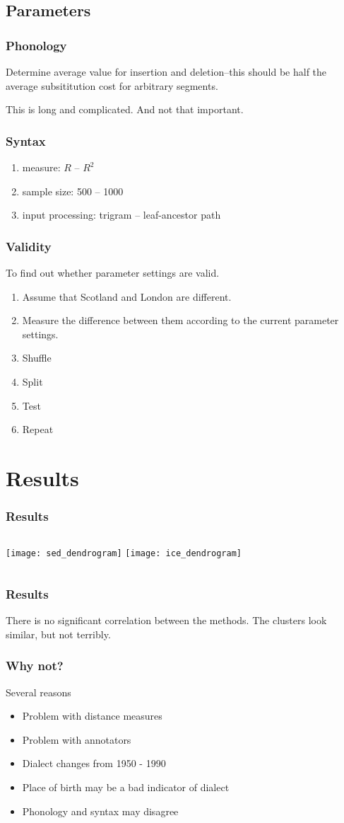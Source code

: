 \documentclass{beamer}
\begin{document}
\subsection{Parameters}
\begin{frame}
\frametitle{Phonology}
  Determine average value for insertion and deletion--this should be
  half the average subsititution cost for arbitrary segments.

  This is long and complicated. And not that important.
\end{frame}
\begin{frame}
  \frametitle{Syntax}
  \begin{enumerate}
  \item measure: $R$ -- $R^2$
  \item sample size: 500 -- 1000
  \item input processing: trigram -- leaf-ancestor path
  \end{enumerate}
\end{frame}
\begin{frame}
  \frametitle{Validity}
  To find out whether parameter settings are valid.
  \begin{enumerate}
  \item Assume that Scotland and London are different.
  \item Measure the difference between them according to the current parameter
    settings.
  \item  Shuffle
  \item Split
  \item Test
  \item Repeat
  \end{enumerate}
\end{frame}
\section{Results}
\begin{frame}
  \frametitle{Results}
  \begin{columns}
  \texttt{[image: sed\_dendrogram]}
  \texttt{[image: ice\_dendrogram]}
\end{columns}
\end{frame}
\begin{frame}
  \frametitle{Results}
  There is no significant correlation between the methods.
  The clusters look similar, but not terribly.
\end{frame}
\begin{frame}
  \frametitle{Why not?}
  Several reasons
  \begin{itemize}
  \item Problem with distance measures
  \item Problem with annotators
  \item Dialect changes from 1950 - 1990
  \item Place of birth may be a bad indicator of dialect
  \item Phonology and syntax may disagree
  \end{itemize}
\end{frame}
\end{document}
